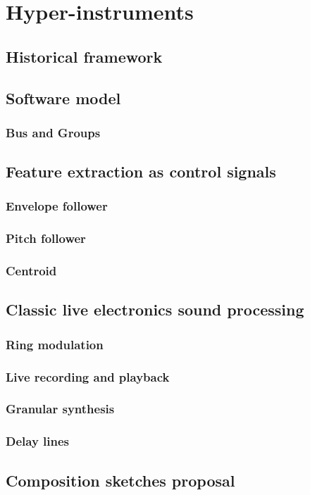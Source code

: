\chapter{Hyper-instruments}

\section{Historical framework}\label{historical-framework}

\section{Software model}\label{software-model}
\subsection{Bus and Groups}\label{bus-and-groups}

\section{Feature extraction as control signals}\label{feature-extraction-as-control-signals}
\subsection{Envelope follower}\label{envelope-follower}
\subsection{Pitch follower}\label{pitch-follower}
\subsection{Centroid}\label{centroid}

\section{Classic live electronics sound processing}\label{classic-live-electronics-sound-processing}
\subsection{Ring modulation}\label{ring-modulation}
\subsection{Live recording and playback}\label{live-recording-and-playback}
\subsection{Granular synthesis}\label{granular-synthesis}
\subsection{Delay lines}\label{delay-lines}

\section{Composition sketches proposal}\label{composition-sketches-proposal}
